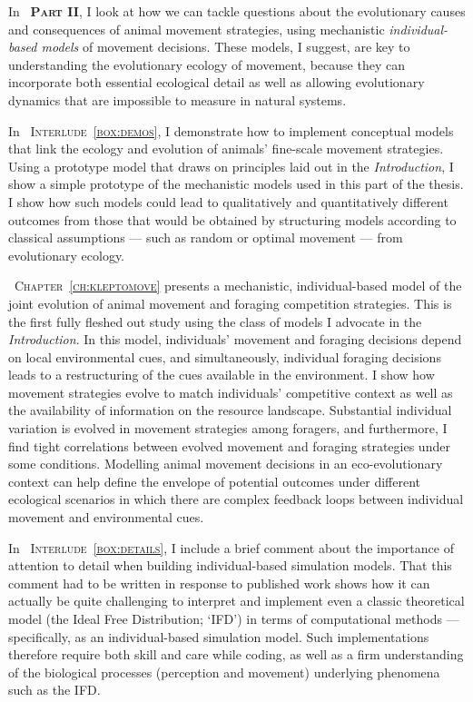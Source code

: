 \medskip

In {\scshape~\textbf{Part II}}, I look at how we can tackle questions about the evolutionary causes and consequences of animal movement strategies, using mechanistic \textit{individual-based models} of movement decisions.
These models, I suggest, are key to understanding the evolutionary ecology of movement, because they can incorporate both essential ecological detail as well as allowing evolutionary dynamics that are impossible to measure in natural systems.

\medskip

In {\scshape~Interlude~\ref{box:demos}}, I demonstrate how to implement conceptual models that link the ecology and evolution of animals' fine-scale movement strategies.
Using a prototype model that draws on principles laid out in the \emph{Introduction}, I show a simple prototype of the mechanistic models used in this part of the thesis.
I show how such models could lead to qualitatively and quantitatively different outcomes from those that would be obtained by structuring models according to classical assumptions --- such as random or optimal movement --- from evolutionary ecology.

\medskip

{\scshape~Chapter~\ref{ch:kleptomove}} presents a mechanistic, individual-based model of the joint evolution of animal movement and foraging competition strategies.
This is the first fully fleshed out study using the class of models I advocate in the \emph{Introduction}.
In this model, individuals' movement and foraging decisions depend on local environmental cues, and simultaneously, individual foraging decisions leads to a restructuring of the cues available in the environment.
I show how movement strategies evolve to match individuals' competitive context as well as the availability of information on the resource landscape.
Substantial individual variation is evolved in movement strategies among foragers, and furthermore, I find tight correlations between evolved movement and foraging strategies under some conditions.
Modelling animal movement decisions in an eco-evolutionary context can help define the envelope of potential outcomes under different ecological scenarios in which there are complex feedback loops between individual movement and environmental cues.

\medskip

In {\scshape~Interlude~\ref{box:details}}, I include a brief comment about the importance of attention to detail when building individual-based simulation models.
That this comment had to be written in response to published work shows how it can actually be quite challenging to interpret and implement even a classic theoretical model (the Ideal Free Distribution; `IFD') in terms of computational methods --- specifically, as an individual-based simulation model.
Such implementations therefore require both skill and care while coding, as well as a firm understanding of the biological processes (perception and movement) underlying phenomena such as the IFD.

